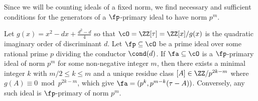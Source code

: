 \documentclass[11pt, proquest]{uwthesis}
\begin{document}
  Since we will be counting ideals of a fixed norm, we find necessary and sufficient conditions for the generators of a $\fp$-primary ideal to have norm $p^m$.
  \begin{lemma}\label{lemma:pIdeals}
  Let $g(x) = x^2  -dx + \frac{d^2-d}{4}$ so that $\cO = \ZZ[\tau] = \ZZ[x]/g(x)$ is the quadratic imaginary order of discriminant $d$. Let $\fp\subseteq \cO$ be a prime ideal over some rational prime $p$ dividing the conductor $\cond(d)$.
    If $\fa\subseteq \cO$ is a $\fp$-primary ideal of norm $p^m$ for some non-negative integer $m$, then there exists a minimal integer $k$ with $m/2\leq k\leq m$ and a unique residue class $[A]\in\ZZ/p^{2k-m}$ where $g(A)\equiv 0\bmod p^{2k-m}$, which give $\fa = (p^k, p^{m-k}(\tau - A))$. Conversely, any such ideal is $\fp$-primary of norm $p^m$.
  \end{lemma}
\end{document}

